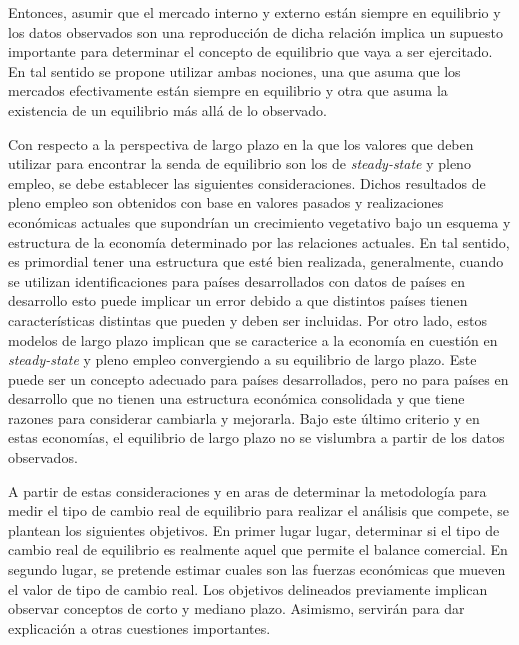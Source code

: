 \documentclass[12pt,letterpaper]{article}
\begin{document}
Entonces, asumir que el mercado interno y externo están siempre en equilibrio y los datos observados son una reproducción de dicha relación implica un supuesto importante para determinar el concepto de equilibrio que vaya a ser ejercitado. En tal sentido se propone utilizar ambas nociones, una que asuma que los mercados efectivamente están siempre en equilibrio y otra que asuma la existencia de un equilibrio más allá de lo observado.

Con respecto a la perspectiva de largo plazo en la que los valores que deben utilizar para encontrar la senda de equilibrio son los de \emph{steady-state} y pleno empleo, se debe establecer las siguientes consideraciones. Dichos resultados de pleno empleo son obtenidos con base en valores pasados y realizaciones económicas actuales que supondrían un crecimiento vegetativo bajo un esquema y estructura de la economía determinado por las relaciones actuales. En tal sentido, es primordial tener una estructura que esté bien realizada, generalmente, cuando se utilizan identificaciones para países desarrollados con datos de países en desarrollo esto puede implicar un error debido a que distintos países tienen características distintas que pueden y deben ser incluidas. Por otro lado, estos modelos de largo plazo implican que se caracterice a la economía en cuestión en \emph{steady-state} y pleno empleo convergiendo a su equilibrio de largo plazo. Este puede ser un concepto adecuado para países desarrollados, pero no para países en desarrollo que no tienen una estructura económica consolidada y que tiene razones para considerar cambiarla y mejorarla. Bajo este último criterio y en estas economías, el equilibrio de largo plazo no se vislumbra a partir de los datos observados. 

A partir de estas consideraciones y en aras de determinar la metodología para medir el tipo de cambio real de equilibrio para realizar el análisis que compete, se plantean los siguientes objetivos. En primer lugar lugar, determinar si el tipo de cambio real de equilibrio es realmente aquel que permite el balance comercial. En segundo lugar, se pretende estimar cuales son las fuerzas económicas que mueven el valor de tipo de cambio real. 
Los objetivos delineados previamente implican observar conceptos de corto y mediano plazo. Asimismo, servirán para dar explicación a otras cuestiones importantes.
\end{document}
